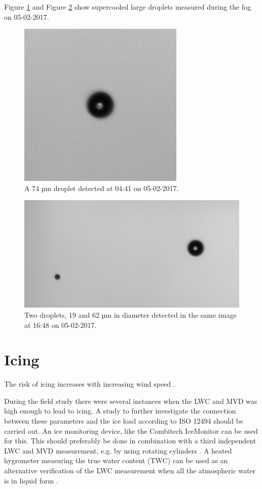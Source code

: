 Figure \ref{fig:170505_0441_droplet} and Figure \ref{fig:170505_1648_droplet} show supercooled large droplets measured during the fog on 05-02-2017.

\begin{figure}[ht]
  \centering
  \includegraphics[width=0.4\linewidth]{figures/170205_0441_droplet_74um}
\caption{A 74 µm droplet detected at 04:41 on 05-02-2017.}
\label{fig:170505_0441_droplet}
\end{figure}
\begin{figure}[ht]
  \centering
  \includegraphics[width=0.8\linewidth]{figures/170205_1648_droplet_19and62um}
\caption{Two droplets, 19 and 62 µm in diameter detected in the same image at 16:48 on 05-02-2017.}
\label{fig:170505_1648_droplet}
\end{figure}


\section{Icing}

The risk of icing increases with increasing wind speed \cite{makk2000}.

During the field study there were several instances when the LWC and MVD was high enough to lead to icing. A study to further investigate the connection between these parameters and the ice load according to ISO 12494 \cite{makk2014} should be carried out. An ice monitoring device, like the Combitech IceMonitor \cite{cost727,thors2015} can be used for this. This should preferably be done in combination with a third independent LWC and MVD measurement, e.g. by using rotating cylinders \cite{makk1992,knez2005}. A heated hygrometer measuring the true water content (TWC) can be used as an alternative verification of the LWC measurement when all the atmospheric water is in liquid form \cite{spie2012}.






